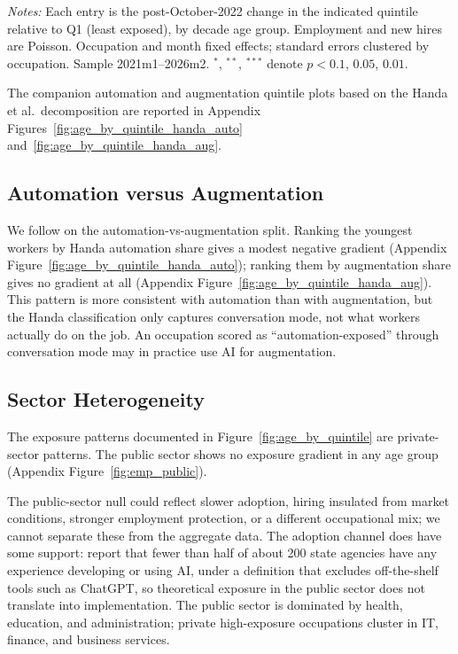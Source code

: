 \documentclass[12pt]{article}
\begin{document}
\begin{table}[tp]
  \centering
  \caption{Cell-level difference-in-differences by AI-exposure quintile, private sector.}
  \label{tab:did_cell}
  
  \begin{minipage}{\textwidth}\footnotesize\textit{Notes:} Each entry is the post-October-2022 change in the indicated quintile relative to Q1 (least exposed), by decade age group. Employment and new hires are Poisson. Occupation and month fixed effects; standard errors clustered by occupation. Sample 2021m1--2026m2. $^{*}$, $^{**}$, $^{***}$ denote $p<0.1$, $0.05$, $0.01$.\end{minipage}
\end{table}

The companion automation and augmentation quintile plots based on the Handa et al.\ decomposition are reported in Appendix Figures~\ref{fig:age_by_quintile_handa_auto} and~\ref{fig:age_by_quintile_handa_aug}.


\subsection{Automation versus Augmentation}\label{sec:results:auto_aug}

We follow \citet{brynjolfsson2025} on the automation-vs-augmentation split. Ranking the youngest workers by Handa automation share gives a modest negative gradient (Appendix Figure~\ref{fig:age_by_quintile_handa_auto}); ranking them by augmentation share gives no gradient at all (Appendix Figure~\ref{fig:age_by_quintile_handa_aug}). This pattern is more consistent with automation than with augmentation, but the Handa classification only captures conversation mode, not what workers actually do on the job. An occupation scored as ``automation-exposed'' through conversation mode may in practice use AI for augmentation.


\subsection{Sector Heterogeneity}\label{sec:results:sectors}

The exposure patterns documented in Figure~\ref{fig:age_by_quintile} are private-sector patterns. The public sector shows no exposure gradient in any age group (Appendix Figure~\ref{fig:emp_public}).

The public-sector null could reflect slower adoption, hiring insulated from market conditions, stronger employment protection, or a different occupational mix; we cannot separate these from the aggregate data. The adoption channel does have some support: \citet{riksrevisjonen2024} report that fewer than half of about 200 state agencies have any experience developing or using AI, under a definition that excludes off-the-shelf tools such as ChatGPT, so theoretical exposure in the public sector does not translate into implementation. The public sector is dominated by health, education, and administration; private high-exposure occupations cluster in IT, finance, and business services.
\end{document}
